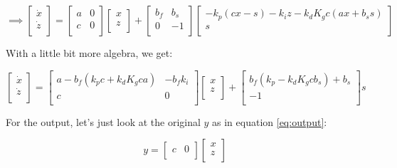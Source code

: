 \documentclass[10pt,letterpaper]{article}
\begin{document}
\[
\implies
\begin{bmatrix}
    \dot{x} \\
    \dot{z} \\
\end{bmatrix} =
\begin{bmatrix}
	a & 0 \\
	c & 0 \\
\end{bmatrix}
\begin{bmatrix}
	x \\
	z \\
\end{bmatrix} + 
\begin{bmatrix}
	b_f & b_s \\
	0 & -1 \\
\end{bmatrix}
\begin{bmatrix}
	-k_p (cx - s) -k_i z - k_d K_g c (ax + b_s s) \\
	s \\
\end{bmatrix}
\]

With a little bit more algebra, we get:

\begin{equation} \label{eq:final_state}
\begin{bmatrix}
    \dot{x} \\
    \dot{z} \\
\end{bmatrix} =
\begin{bmatrix}
	a - b_f (k_p c + k_d K_g c a) & -b_f k_i \\
	c & 0 \\
\end{bmatrix}
\begin{bmatrix}
	x \\
	z \\
\end{bmatrix} + 
\begin{bmatrix}
	b_f ( k_p - k_d K_g c b_s ) + b_s \\
	-1 \\
\end{bmatrix} s
\end{equation}

For the output, let's just look at the original $y$ as in equation \ref{eq:output}:

\begin{equation} \label{eq:final_output}
y = \begin{bmatrix}
	c & 0 \\
\end{bmatrix}
\begin{bmatrix}
	x \\
	z \\
\end{bmatrix}
\end{equation}
\end{document}
